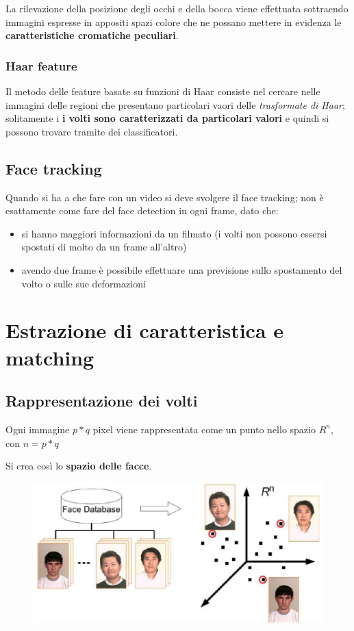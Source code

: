 \documentclass{report}
\begin{document}
\noindent La rilevazione della posizione degli occhi e della 
bocca viene effettuata sottraendo immagini espresse in appositi 
spazi colore che ne possano mettere in evidenza le \textbf{caratteristiche 
cromatiche peculiari}.

\subsection{Haar feature}
Il metodo delle feature basate su funzioni di Haar consiste 
nel cercare nelle immagini delle regioni che presentano 
particolari vaori delle \textit{trasformate di Haar};
solitamente i \textbf{i volti sono caratterizzati da particolari 
valori} e quindi si possono trovare tramite dei classificatori.

\section{Face tracking}
Quando si ha a che fare con un video si deve svolgere il face tracking;
non è esattamente come fare del face detection in ogni frame, dato che:
\begin{itemize}
    \item si hanno maggiori informazioni da un filmato (i volti non possono 
    essersi spostati di molto da un frame all'altro)
    \item avendo due frame è possibile effettuare una previsione sullo spostamento 
    del volto o sulle sue deformazioni
\end{itemize}

\chapter{Estrazione di caratteristica e matching}

\section{Rappresentazione dei volti}
Ogni immagine $p * q$ pixel viene rappresentata come un punto 
nello spazio $R^n$, con $n = p * q$

\noindent Si crea così lo \textbf{spazio delle facce}.

\begin{figure}[ht]
    \centering
    \includegraphics[width=0.8\linewidth]{images/spazio-facce.png}
\end{figure}
\end{document}
